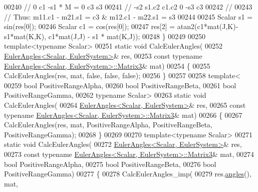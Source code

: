 \begin{DoxyCode}
00240       \textcolor{comment}{//  0   c1    -s1       *    M    =   0  c3  s3}
00241       \textcolor{comment}{//  -s2 s1.c2 c1.c2                   0 -s3  c3}
00242       \textcolor{comment}{//}
00243       \textcolor{comment}{//  Thus:  m11.c1 - m21.s1 = c3  &   m12.c1 - m22.s1 = s3}
00244 
00245       Scalar s1 = sin(res[0]);
00246       Scalar c1 = cos(res[0]);
00247       res[2] = atan2(c1*mat(J,K)-s1*mat(K,K), c1*mat(J,J) - s1 * mat(K,J));
00248     \}
00249     
00250     \textcolor{keyword}{template}<\textcolor{keyword}{typename} Scalar>
00251     \textcolor{keyword}{static} \textcolor{keywordtype}{void} CalcEulerAngles(
00252       \hyperlink{class_eigen_1_1_euler_angles}{EulerAngles<Scalar, EulerSystem>}& res,
00253       \textcolor{keyword}{const} \textcolor{keyword}{typename} \hyperlink{group___core___module_class_eigen_1_1_matrix}{EulerAngles<Scalar, EulerSystem>::Matrix3}& 
      mat)
00254     \{
00255       CalcEulerAngles(res, mat, \textcolor{keyword}{false}, \textcolor{keyword}{false}, \textcolor{keyword}{false});
00256     \}
00257     
00258     \textcolor{keyword}{template}<
00259       \textcolor{keywordtype}{bool} PositiveRangeAlpha,
00260       \textcolor{keywordtype}{bool} PositiveRangeBeta,
00261       \textcolor{keywordtype}{bool} PositiveRangeGamma,
00262       \textcolor{keyword}{typename} Scalar>
00263     \textcolor{keyword}{static} \textcolor{keywordtype}{void} CalcEulerAngles(
00264       \hyperlink{class_eigen_1_1_euler_angles}{EulerAngles<Scalar, EulerSystem>}& res,
00265       \textcolor{keyword}{const} \textcolor{keyword}{typename} \hyperlink{group___core___module_class_eigen_1_1_matrix}{EulerAngles<Scalar, EulerSystem>::Matrix3}& 
      mat)
00266     \{
00267       CalcEulerAngles(res, mat, PositiveRangeAlpha, PositiveRangeBeta, PositiveRangeGamma);
00268     \}
00269     
00270     \textcolor{keyword}{template}<\textcolor{keyword}{typename} Scalar>
00271     \textcolor{keyword}{static} \textcolor{keywordtype}{void} CalcEulerAngles(
00272       \hyperlink{class_eigen_1_1_euler_angles}{EulerAngles<Scalar, EulerSystem>}& res,
00273       \textcolor{keyword}{const} \textcolor{keyword}{typename} \hyperlink{group___core___module_class_eigen_1_1_matrix}{EulerAngles<Scalar, EulerSystem>::Matrix3}& 
      mat,
00274       \textcolor{keywordtype}{bool} PositiveRangeAlpha,
00275       \textcolor{keywordtype}{bool} PositiveRangeBeta,
00276       \textcolor{keywordtype}{bool} PositiveRangeGamma)
00277     \{
00278       CalcEulerAngles\_imp(
00279         res.\hyperlink{class_eigen_1_1_euler_angles_a2decf84b5efd265f7251fd32f539a36b}{angles}(), mat,

\end{DoxyCode}
